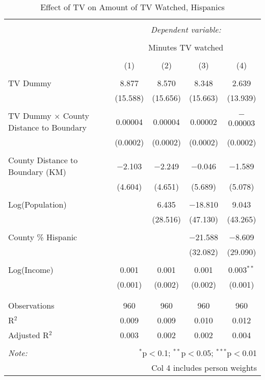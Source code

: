 
\begin{table}[!htbp] \centering 
  \caption{Effect of TV on Amount of TV Watched, Hispanics} 
  \label{} 
\begin{tabular}{@{\extracolsep{-5pt}}lcccc} 
\\[-1.8ex]\hline 
\hline \\[-1.8ex] 
 & \multicolumn{4}{c}{\textit{Dependent variable:}} \\ 
\cline{2-5} 
\\[-1.8ex] & \multicolumn{4}{c}{Minutes TV watched} \\ 
\\[-1.8ex] & (1) & (2) & (3) & (4)\\ 
\hline \\[-1.8ex] 
 TV Dummy & 8.877 & 8.570 & 8.348 & 2.639 \\ 
  & (15.588) & (15.656) & (15.663) & (13.939) \\ 
  & & & & \\ 
 TV Dummy $\times$ County Distance to Boundary  & 0.00004 & 0.00004 & 0.00002 & $-$0.00003 \\ 
  & (0.0002) & (0.0002) & (0.0002) & (0.0002) \\ 
  & & & & \\ 
 County Distance to Boundary (KM) & $-$2.103 & $-$2.249 & $-$0.046 & $-$1.589 \\ 
  & (4.604) & (4.651) & (5.689) & (5.078) \\ 
  & & & & \\ 
 Log(Population) &  & 6.435 & $-$18.810 & 9.043 \\ 
  &  & (28.516) & (47.130) & (43.265) \\ 
  & & & & \\ 
 County \% Hispanic &  &  & $-$21.588 & $-$8.609 \\ 
  &  &  & (32.082) & (29.090) \\ 
  & & & & \\ 
 Log(Income) & 0.001 & 0.001 & 0.001 & 0.003$^{**}$ \\ 
  & (0.001) & (0.002) & (0.002) & (0.001) \\ 
  & & & & \\ 
\hline \\[-1.8ex] 
Observations & 960 & 960 & 960 & 960 \\ 
R$^{2}$ & 0.009 & 0.009 & 0.010 & 0.012 \\ 
Adjusted R$^{2}$ & 0.003 & 0.002 & 0.002 & 0.004 \\ 
\hline 
\hline \\[-1.8ex] 
\textit{Note:}  & \multicolumn{4}{r}{$^{*}$p$<$0.1; $^{**}$p$<$0.05; $^{***}$p$<$0.01} \\ 
 & \multicolumn{4}{r}{Col 4 includes person weights} \\ 
\end{tabular} 
\end{table} 
